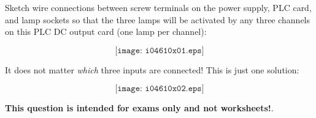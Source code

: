 

Sketch wire connections between screw terminals on the power supply, PLC card, and lamp sockets so that the three lamps will be activated by any three channels on this PLC DC output card (one lamp per channel):

$$\texttt{[image: i04610x01.eps]}$$







It does not matter {\it which} three inputs are connected!  This is just one solution:

$$\texttt{[image: i04610x02.eps]}$$







{\bf This question is intended for exams only and not worksheets!}.



